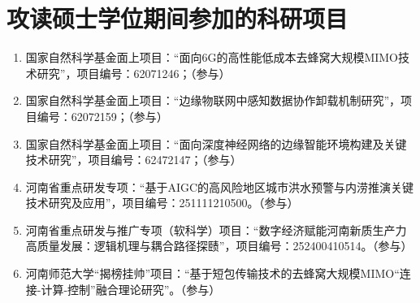 \chapter{攻读硕士学位期间参加的科研项目}
\begin{enumerate}

\item{国家自然科学基金面上项目}：“面向6G的高性能低成本去蜂窝大规模MIMO技术研究”，项目编号：62071246；（参与）\par
\item{国家自然科学基金面上项目}：“边缘物联网中感知数据协作卸载机制研究”，项目编号：62072159；（参与）\par
\item{国家自然科学基金面上项目}：“面向深度神经网络的边缘智能环境构建及关键技术研究”，项目编号：62472147；（参与）\par
\item{河南省重点研发专项}：“基于AIGC的高风险地区城市洪水预警与内涝推演关键技术研究及应用”，项目编号：251111210500。（参与）\par
\item{河南省重点研发与推广专项（软科学）项目}：“数字经济赋能河南新质生产力高质量发展：逻辑机理与耦合路径探赜”，项目编号：252400410514。（参与）\par
\item{河南师范大学“揭榜挂帅”项目}：“基于短包传输技术的去蜂窝大规模MIMO“连接-计算-控制”融合理论研究”。（参与）\par
\end{enumerate}



